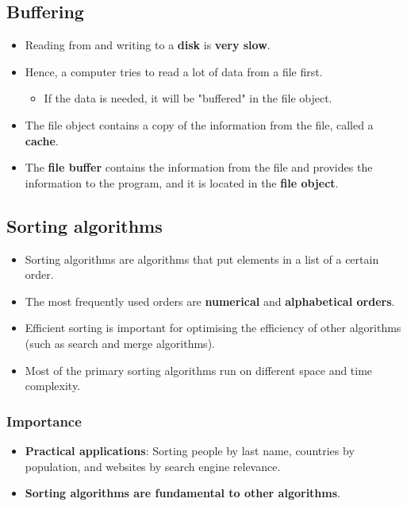 \documentclass[11pt]{article}
\begin{document}
\subsection{Buffering}
\label{sec:orga0e567d}
\begin{itemize}
\item Reading from and writing to a \textbf{disk} is \textbf{very slow}.
\item Hence, a computer tries to read a lot of data from a file first.
\begin{itemize}
\item If the data is needed, it will be "buffered" in the file object.
\end{itemize}
\item The file object contains a copy of the information from the file, called a \textbf{cache}.
\item The \textbf{file buffer} contains the information from the file and provides the information to the program, and it is located in the \textbf{file object}.
\end{itemize}

\subsection{Sorting algorithms}
\label{sec:org8f8849a}
\begin{itemize}
\item Sorting algorithms are algorithms that put elements in a list of a certain order.
\item The most frequently used orders are \textbf{numerical} and \textbf{alphabetical orders}.
\item Efficient sorting is important for optimising the efficiency of other algorithms (such as search and merge algorithms).
\item Most of the primary sorting algorithms run on different space and time complexity.
\end{itemize}

\subsubsection{Importance}
\label{sec:org5803694}
\begin{itemize}
\item \textbf{Practical applications}: Sorting people by last name, countries by population, and websites by search engine relevance.
\item \textbf{Sorting algorithms are fundamental to other algorithms}.
\end{itemize}
\end{document}
